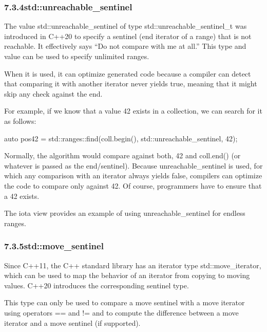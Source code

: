 \subsubsection*{ 7.3.4\hspace{0.2cm}std::unreachable\_sentinel}

The value std::unreachable\_sentinel of type std::unreachable\_sentinel\_t was introduced in C++20 to specify a sentinel (end iterator of a range) that is not reachable. It effectively says “Do not compare with me at all.” This type and value can be used to specify unlimited ranges.

When it is used, it can optimize generated code because a compiler can detect that comparing it with another iterator never yields true, meaning that it might skip any check against the end.

For example, if we know that a value 42 exists in a collection, we can search for it as follows:

\begin{cpp}
auto pos42 = std::ranges::find(coll.begin(), std::unreachable_sentinel,
					42);
\end{cpp}

Normally, the algorithm would compare against both, 42 and coll.end() (or whatever is passed as the end/sentinel). Because unreachable\_sentinel is used, for which any comparison with an iterator always yields false, compilers can optimize the code to compare only against 42. Of course, programmers have to ensure that a 42 exists.

The iota view provides an example of using unreachable\_sentinel for endless ranges.

\subsubsection*{ 7.3.5\hspace{0.2cm}std::move\_sentinel}

Since C++11, the C++ standard library has an iterator type std::move\_iterator, which can be used to map the behavior of an iterator from copying to moving values. C++20 introduces the corresponding sentinel type.

This type can only be used to compare a move sentinel with a move iterator using operators == and != and to compute the difference between a move iterator and a move sentinel (if supported).


